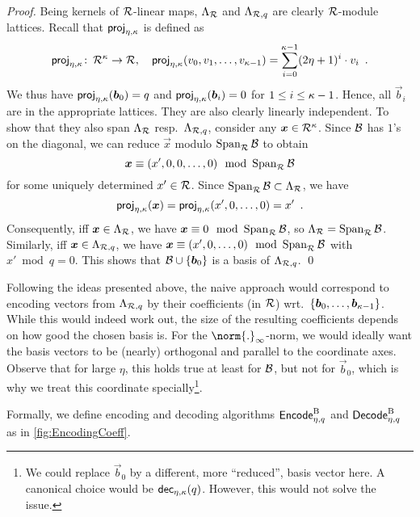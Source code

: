 \begin{proof}
Being kernels of $\mathcal{R}$-linear maps, $\Lambda_{\mathcal{R}}$ and $\Lambda_{\mathcal{R},q}$ are clearly $\mathcal{R}$-module lattices. Recall that $\mathsf{proj}_{\eta,\kappa}$ is defined as
\[
\mathsf{proj}_{\eta,\kappa}\colon\,\mathcal{R}^\kappa\to\mathcal{R}, \quad \mathsf{proj}_{\eta,\kappa}(v_0,v_1,\ldots, v_{\kappa-1}) = \sum_{i=0}^{\kappa-1} (2\eta+1)^i \cdot v_i\enspace.
\]
We thus have $\mathsf{proj}_{\eta,\kappa}(\boldsymbol{b}_0) = q$ and $\mathsf{proj}_{\eta,\kappa}(\boldsymbol{b}_i) = 0$ for $1\leq i \leq \kappa-1$.
Hence, all $\vec{b}_i$ are in the appropriate lattices.
They are also clearly linearly independent.
To show that they also span $\Lambda_{\mathcal{R}}$ resp.\ $\Lambda_{\mathcal{R},q}$, consider any $\boldsymbol{x}\in\mathcal{R}^\kappa$.
Since $\mathcal{B}$ has $1$'s on the diagonal, we can reduce $\vec{x}$ modulo $\operatorname*{Span}_{\mathcal{R}} \mathcal{B}$ to obtain
\[
  \boldsymbol{x}\equiv (x',0,0,\ldots, 0) \mod {\operatorname*{Span}}\nolimits_{\mathcal{R}}\mathcal{B}
\]
for some uniquely determined $x'\in\mathcal{R}$.
Since $\operatorname*{Span}_{\mathcal{R}}\mathcal{B}\subset \Lambda_{\mathcal{R}}$, we have 
\[
 \mathsf{proj}_{\eta,\kappa}(\boldsymbol{x}) = \mathsf{proj}_{\eta,\kappa}(x',0,\ldots, 0) = x'\enspace. 
\]
Consequently, iff $\boldsymbol{x}\in\Lambda_{\mathcal{R}}$, we have $\boldsymbol{x}\equiv 0 \mod {\operatorname*{Span}}_{\mathcal{R}}\mathcal{B}$, so $\Lambda_{\mathcal{R}} = \operatorname*{Span}_{\mathcal{R}}\mathcal{B}$.
Similarly, iff $\boldsymbol{x}\in\Lambda_{\mathcal{R},q}$, we have $\boldsymbol{x}\equiv (x',0,\ldots, 0) \mod {\operatorname*{Span}}_{\mathcal{R}}\mathcal{B}$ with $x'\bmod q = 0$. This shows that $\mathcal{B}\cup\{\boldsymbol{b}_0\}$ is a basis of $\Lambda_{\mathcal{R},q}$.
\qed
\end{proof}
Following the ideas presented above, the naive approach would correspond to encoding vectors from $\Lambda_{\mathcal{R},q}$ by their coefficients (in $\mathcal{R}$) wrt.\ $\{\boldsymbol{b}_0,\ldots,\boldsymbol{b}_{\kappa-1}\}$.
While this would indeed work out, the size of the resulting coefficients depends on how good the chosen basis is.
For the $\norm{.}_\infty$-norm, we would ideally want the basis vectors to be (nearly) orthogonal and parallel to the coordinate axes.
Observe that for large $\eta$, this holds true at least for $\mathcal{B}$, but not for $\vec{b}_0$, which is why we treat this coordinate specially\footnote{We could replace $\vec{b}_0$ by a different, more ``reduced'', basis vector here. A canonical choice would be $\mathsf{dec}_{\eta,\kappa}(q)$. However, this would not solve the issue.}.

Formally, we define encoding and decoding algorithms $\mathsf{Encode}^{\textup{B}}_{\eta,q}$ and $\mathsf{Decode}^{\textup{B}}_{\eta,q}$ as in \autoref{fig:EncodingCoeff}.




